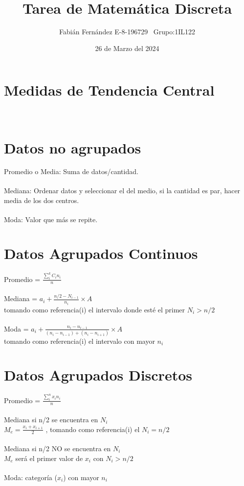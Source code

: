 \documentclass[14pt]{extarticle}
\title{Tarea de Matemática Discreta}
\author{Fabián Fernández E-8-196729   \,\,\,Grupo:1IL122}
\date{26 de Marzo del 2024}
\begin{document}
	\section*{}
	
	\section*{\centering Medidas de Tendencia Central}
	
	\section*{\\ \normalsize Datos no agrupados }
	Promedio o Media: Suma de datos/cantidad.\\\\
	Mediana: Ordenar datos y seleccionar el del medio, si la cantidad es par, hacer media de los dos centros.\\\\
	Moda: Valor que más se repite.
	
	\section*{\normalsize Datos Agrupados Continuos}
	Promedio = $\frac{\sum_{i}^{k} C_i n_i}{n}$ \\\\
	Mediana = $a_i + \frac{n/2 - N_{i-1}}{n_i} \times A$   \\ tomando como referencia(i) el intervalo donde esté el primer $N_i > n/2$\\\\
	Moda = $a_i + \frac{n_i - n_{i-1}}{(n_i - n_{i-1}) + (n_i - n_{i+1})} \times A$\\tomando como referencia(i) el intervalo con mayor $n_i$
	

	\section*{\normalsize Datos Agrupados Discretos}
	Promedio = $\frac{\sum_{i}^{n} x_i n_i}{n}$ \\\\
	Mediana si n/2 se encuentra en $N_i$ \\
$M_e = \frac{x_i + x_{i+1}}{2}$ , tomando como referencia(i) el $N_i = n/2$ \\\\
Mediana si n/2 NO se encuentra en $N_i$ \\
$M_e$ será el primer valor de $x_i$ con $N_i > n/2$ \\\\
Moda: categoría ($x_i$) con mayor $n_i$ \\\\\\\\\\\
\end{document}
